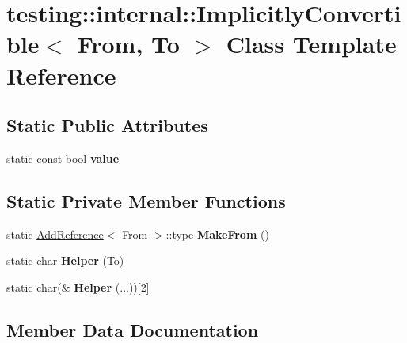 \hypertarget{classtesting_1_1internal_1_1_implicitly_convertible}{}\section{testing\+:\+:internal\+:\+:Implicitly\+Convertible$<$ From, To $>$ Class Template Reference}
\label{classtesting_1_1internal_1_1_implicitly_convertible}
\subsection*{Static Public Attributes}
\begin{DoxyCompactItemize}
\item 
static const bool {\bfseries value}
\end{DoxyCompactItemize}
\subsection*{Static Private Member Functions}
\begin{DoxyCompactItemize}
\item 
\mbox{\label{classtesting_1_1internal_1_1_implicitly_convertible_adb692b091aebd0cde316c8c2c0ab661f}} 
static \hyperlink{structtesting_1_1internal_1_1_add_reference}{Add\+Reference}$<$ From $>$\+::type {\bfseries Make\+From} ()
\item 
\mbox{\label{classtesting_1_1internal_1_1_implicitly_convertible_a20029a4415e5f9ae152b8fce8b124980}} 
static char {\bfseries Helper} (To)
\item 
\mbox{\label{classtesting_1_1internal_1_1_implicitly_convertible_aba219f30a4cbba407d8141ce53fbfeb7}} 
static char(\& {\bfseries Helper} (...))\mbox{[}2\mbox{]}
\end{DoxyCompactItemize}


\subsection{Member Data Documentation}
\mbox{\label{classtesting_1_1internal_1_1_implicitly_convertible_aea51cecabca681fb75659e224771b7b7}} 
